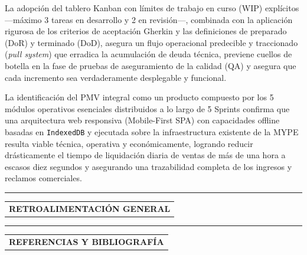 \vspace{0.6em}
\noindent La adopción del tablero Kanban con límites de trabajo en curso (WIP) explícitos —máximo 3 tareas en desarrollo y 2 en revisión—, combinada con la aplicación rigurosa de los criterios de aceptación Gherkin y las definiciones de preparado (DoR) y terminado (DoD), asegura un flujo operacional predecible y traccionado (\textit{pull system}) que erradica la acumulación de deuda técnica, previene cuellos de botella en la fase de pruebas de aseguramiento de la calidad (QA) y asegura que cada incremento sea verdaderamente desplegable y funcional.

\vspace{0.6em}
\noindent La identificación del PMV integral como un producto compuesto por los 5 módulos operativos esenciales distribuidos a lo largo de 5 Sprints confirma que una arquitectura web responsiva (Mobile-First SPA) con capacidades offline basadas en \texttt{IndexedDB} y ejecutada sobre la infraestructura existente de la MYPE resulta viable técnica, operativa y económicamente, logrando reducir drásticamente el tiempo de liquidación diaria de ventas de más de una hora a escasos diez segundos y asegurando una trazabilidad completa de los ingresos y reclamos comerciales.

\hrule

\vspace{0.8em}
\noindent
{\renewcommand{\arraystretch}{1.0}
\begin{tabularx}{\linewidth}{|>{\centering\arraybackslash}X|}
    \hline
    \rowcolor{tablebackground}
    \textbf{\large\color{white} RETROALIMENTACIÓN GENERAL} \\
\end{tabularx}
}
\vspace{1.5em}


\hrule

\vspace{0.8em}
\noindent
{\renewcommand{\arraystretch}{1.0}
\begin{tabularx}{\linewidth}{|>{\centering\arraybackslash}X|}
    \hline
    \rowcolor{tablebackground}
    \textbf{\large\color{white} REFERENCIAS Y BIBLIOGRAFÍA} \\
\end{tabularx}
}
\vspace{-1.8em}

